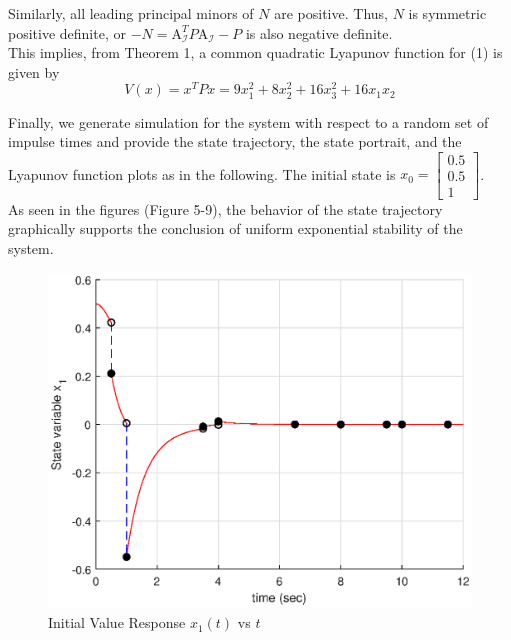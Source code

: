 \documentclass[11pt,a4paper]{article}
\begin{document}
Similarly, all leading principal minors of $N$ are positive. Thus, $N$ is symmetric positive definite, or
$-N = \mathrm{A}^T_{\mathcal{I}}P\mathrm{A}_{\mathcal{I}} - P$ is also negative definite. \\

This implies, from Theorem 1, a common quadratic Lyapunov function for (1) is given by 
$$V(x) = x^TPx = 9x_1^2 + 8x_2^2 + 16x_3^2 + 16x_1x_2$$

Finally, we generate simulation for the system with respect to a random set of impulse times and provide the state trajectory, the state portrait, and the Lyapunov function plots as in the following. The initial state is
$
x_0 = 
\begin{bmatrix}
0.5\\
0.5\\
1
\end{bmatrix}
$.\\

As seen in the figures (Figure 5-9), the behavior of the state trajectory graphically supports the conclusion of uniform exponential stability of the system.\\

\begin{figure}
\centering
\includegraphics[scale=0.8]{FG5.eps} 
\caption{Initial Value Response $x_1(t)$ vs $t$}
\end{figure}
\end{document}
